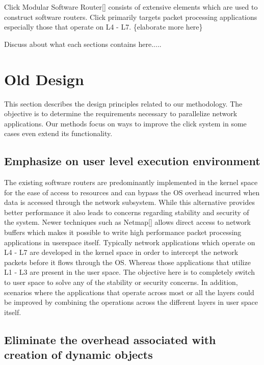 \documentclass[conference]{IEEEtran}
\begin{document}
Click Modular Software Router[] consists of extensive elements which are used to construct software routers. Click primarily targets packet processing applications especially those that operate on L4 - L7. \{elaborate more here\}

Discuss about what each sections contains here.....  

\section{Old Design}

This section describes the design principles related to our methodology. The objective is to determine the requirements necessary to parallelize network applications. Our methods focus on ways to improve the click system in some cases even extend its functionality.

\subsection{Emphasize on user level execution environment}

The existing software routers are predominantly implemented in the kernel space for the ease of access to resources and can bypass the OS overhead incurred when data is accessed through the network subsystem. While this alternative provides better performance it also leads to concerns regarding stability and security of the system. Newer techniques such as Netmap[] allows direct access to network buffers which makes it possible to write high performance packet processing applications in userspace itself. Typically network applications which operate on L4 - L7 are developed in the kernel space in order to intercept the network packets before it flows through the OS. Whereas those applications that utilize L1 - L3 are present in the user space. The objective here is to completely switch to user space to solve any of the stability or security concerns. In addition, scenarios where the applications that operate across most or all the layers could be improved by combining the operations across the different layers in user space itself.  

\subsection{Eliminate the overhead associated with creation of dynamic objects}
\end{document}
